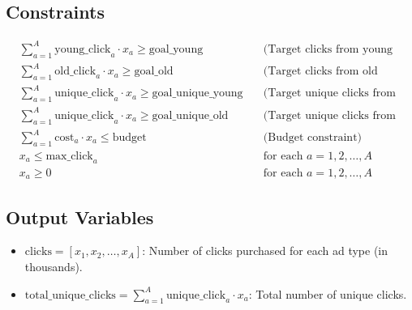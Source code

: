 \documentclass{article}
\begin{document}
\subsection*{Constraints}
\begin{align*}
    & \sum_{a=1}^{A} \text{young\_click}_a \cdot x_a \geq \text{goal\_young} \quad & \text{(Target clicks from young visitors)} \\
    & \sum_{a=1}^{A} \text{old\_click}_a \cdot x_a \geq \text{goal\_old} \quad & \text{(Target clicks from old visitors)} \\
    & \sum_{a=1}^{A} \text{unique\_click}_a \cdot x_a \geq \text{goal\_unique\_young} \quad & \text{(Target unique clicks from young visitors)} \\
    & \sum_{a=1}^{A} \text{unique\_click}_a \cdot x_a \geq \text{goal\_unique\_old} \quad & \text{(Target unique clicks from old visitors)} \\
    & \sum_{a=1}^{A} \text{cost}_a \cdot x_a \leq \text{budget} \quad & \text{(Budget constraint)} \\
    & x_a \leq \text{max\_click}_a \quad & \text{for each } a = 1, 2, \ldots, A \\
    & x_a \geq 0 \quad & \text{for each } a = 1, 2, \ldots, A
\end{align*}

\subsection*{Output Variables}
\begin{itemize}
    \item \( \text{clicks} = [x_1, x_2, \ldots, x_A] \): Number of clicks purchased for each ad type (in thousands).
    \item \( \text{total\_unique\_clicks} = \sum_{a=1}^{A} \text{unique\_click}_a \cdot x_a \): Total number of unique clicks.
\end{itemize}
\end{document}
